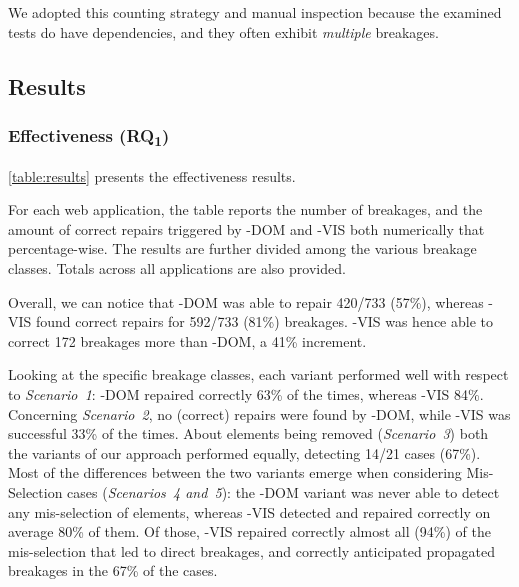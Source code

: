 We adopted this counting strategy and manual inspection because the examined tests do have dependencies, and they often exhibit \textit{multiple} breakages.



\subsection{Results}\label{sec:results}

\subsubsection{Effectiveness (RQ\textsubscript{1})}

\autoref{table:results} presents the effectiveness results. 

For each web application, the table reports the number of breakages, and the amount of correct repairs triggered by \tool-DOM and \tool-VIS both numerically that percentage-wise. 
The results are further divided among the various breakage classes. Totals across all applications are also provided.

Overall, we can notice that \tool-DOM was able to repair 420/733 (57\%), whereas \tool-VIS found correct repairs for 592/733 (81\%) breakages. \tool-VIS was hence able to correct 172 breakages more than \tool-DOM, a 41\% increment.

Looking at the specific breakage classes, each variant performed well with respect to \textit{Scenario~1}: \tool-DOM repaired correctly 63\% of the times, whereas \tool-VIS 84\%. Concerning \textit{Scenario~2}, no (correct) repairs were found by \tool-DOM, while \tool-VIS was successful 33\% of the times.
About elements being removed (\textit{Scenario~3}) both the variants of our approach performed equally, detecting 14/21 cases (67\%). Most of the differences between the two variants emerge when considering Mis-Selection cases (\textit{Scenarios~4 and~5}): the \tool-DOM variant was never able to detect any mis-selection of elements, whereas \tool-VIS detected and repaired correctly on average 80\% of them. Of those, \tool-VIS repaired correctly almost all (94\%) of the mis-selection that led to direct breakages, and correctly anticipated propagated breakages in the 67\% of the cases.

